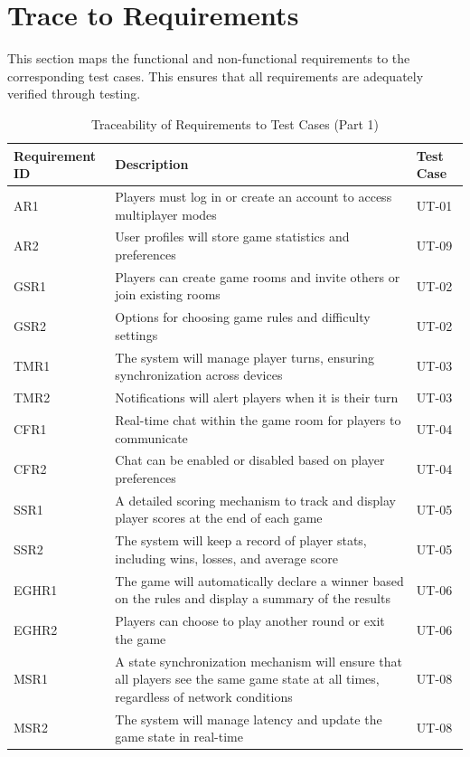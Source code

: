 \documentclass[12pt, titlepage]{article}
\begin{document}
\section{Trace to Requirements}

This section maps the functional and non-functional requirements to the corresponding test cases. This ensures that all requirements are adequately verified through testing.

\begin{table}[H]
    \centering
    \begin{tabularx}{\textwidth}{|l|X|l|}
        \hline
        \textbf{Requirement ID} & \textbf{Description} & \textbf{Test Case} \\
        \hline
        AR1 & Players must log in or create an account to access multiplayer modes & UT-01 \\
        AR2 & User profiles will store game statistics and preferences & UT-09 \\
        GSR1 & Players can create game rooms and invite others or join existing rooms & UT-02 \\
        GSR2 & Options for choosing game rules and difficulty settings & UT-02 \\
        TMR1 & The system will manage player turns, ensuring synchronization across devices & UT-03 \\
        TMR2 & Notifications will alert players when it is their turn & UT-03 \\
        CFR1 & Real-time chat within the game room for players to communicate & UT-04 \\
        CFR2 & Chat can be enabled or disabled based on player preferences & UT-04 \\
        SSR1 & A detailed scoring mechanism to track and display player scores at the end of each game & UT-05 \\
        SSR2 & The system will keep a record of player stats, including wins, losses, and average score & UT-05 \\
        EGHR1 & The game will automatically declare a winner based on the rules and display a summary of the results & UT-06 \\
        EGHR2 & Players can choose to play another round or exit the game & UT-06 \\
        MSR1 & A state synchronization mechanism will ensure that all players see the same game state at all times, regardless of network conditions & UT-08 \\
        MSR2 & The system will manage latency and update the game state in real-time & UT-08 \\
        \hline
    \end{tabularx}
    \caption{Traceability of Requirements to Test Cases (Part 1)}
    \label{tab:trace_requirements_1}
\end{table}
\end{document}
